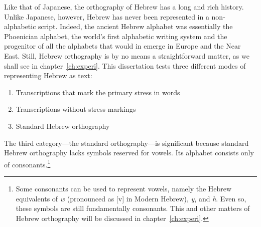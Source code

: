 Like that of Japanese, the orthography of Hebrew has a long and rich history. Unlike Japanese, however, Hebrew has never been represented in a non-alphabetic script. Indeed, the ancient Hebrew alphabet was essentially the Phoenician alphabet, the world's first alphabetic writing system and the progenitor of all the alphabets that would in emerge in Europe and the Near East. Still, Hebrew orthography is by no means a straightforward matter, as we shall see in chapter~\ref{ch:experi}.
This dissertation tests three different modes of representing Hebrew as text:
\begin{enumerate}
\item Transcriptions that mark the primary stress in words
\item Transcriptions without stress markings 
\item Standard Hebrew orthography 
\end{enumerate} 
The third category---the standard orthography---is significant because standard Hebrew 
orthography lacks symbols reserved for vowels. Its alphabet consists only of consonants.\footnote{Some consonants can be used to represent vowels, namely the Hebrew equivalents of \textit{w} (pronounced as [v] in Modern Hebrew), \textit{y}, and \textit{h}. Even so, these symbols are still fundamentally consonants. This and other matters of Hebrew orthography will be discussed in chapter~\ref{ch:experi}.}

